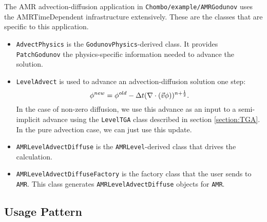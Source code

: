 The AMR advection-diffusion application in
{\tt Chombo/example/AMRGodunov}
uses the AMRTimeDependent infrastructure
extensively.  These are the classes that are specific to this application.
\begin{itemize}
\item \verb|AdvectPhysics| is the \verb|GodunovPhysics|-derived class.   It provides
  \verb|PatchGodunov| the physics-specific information needed to advance the
  solution. 
\item 
\verb|LevelAdvect| is used to advance an advection-diffusion solution one
step:
$$
\phi^{new} = \phi^{old} - \Delta t (\nabla \cdot (\vec v \phi) )^{n+\frac{1}{2}} .
$$
   In the case of non-zero diffusion, we use this advance as an
input to a semi-implicit advance using the \verb|LevelTGA| class
described in section \ref{section:TGA}.   In the pure advection
case, we can just use this update.  
\item \verb|AMRLevelAdvectDiffuse| is the \verb|AMRLevel|-derived class that drives
  the calculation.
\item  \verb|AMRLevelAdvectDiffuseFactory| is the factory class that the user
  sends to \verb|AMR|.  This class generates \verb|AMRLevelAdvectDiffuse| objects
  for \verb|AMR|.
\end{itemize}

\subsection{Usage Pattern}


